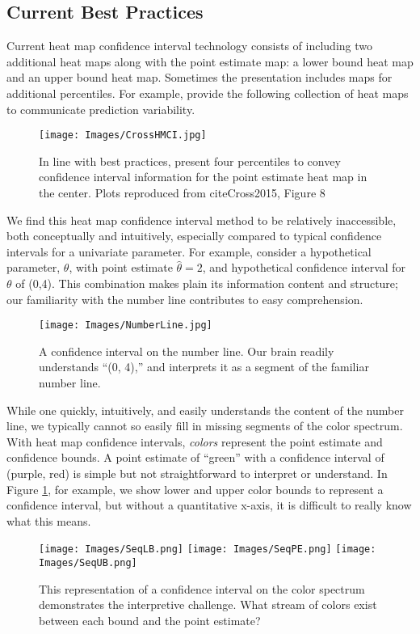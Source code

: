 \subsection{Current Best Practices}

Current heat map confidence interval technology consists of including two additional heat maps along with the point estimate map: a lower bound heat map and an upper bound heat map. Sometimes the presentation includes maps for additional percentiles. For example, \cite{Cross2015} provide the following collection of heat maps to communicate prediction variability.
  \begin{figure}[H]
	\texttt{[image: Images/CrossHMCI.jpg]}
	\caption{In line with best practices, \cite{Cross2015} present four percentiles to convey confidence interval information for the point estimate heat map in the center. Plots reproduced from cite{Cross2015}, Figure 8}
	\end{figure}
We find this heat map confidence interval method to be relatively inaccessible, both conceptually and intuitively, especially compared to typical confidence intervals for a univariate parameter. For example, consider a hypothetical parameter, $\theta$, with point estimate $\hat{\theta} = 2$, and hypothetical confidence interval for $\theta$ of (0,4). This combination makes plain its information content and structure; our familiarity with the number line contributes to easy comprehension.
  \begin{figure}[H]
  \centering
	\texttt{[image: Images/NumberLine.jpg]}
	\caption{A confidence interval on the number line. Our brain readily understands ``(0, 4),'' and interprets it as a segment of the familiar number line. } %
	\end{figure}
While one quickly, intuitively, and easily understands the content of the number line, we typically cannot so easily fill in missing segments of the color spectrum. With heat map confidence intervals, {\it colors} represent the point estimate and confidence bounds. A point estimate of ``green'' with a confidence interval of (purple, red) is simple but not straightforward to interpret or understand. In Figure \ref{fig:colorCI}, for example, we show lower and upper color bounds to represent a confidence interval, but without a quantitative x-axis, it is difficult to really know what this means.
  \begin{figure}[H]
  \centering
	\texttt{[image: Images/SeqLB.png]}
	\texttt{[image: Images/SeqPE.png]}
	\texttt{[image: Images/SeqUB.png]}
	\caption{This representation of a confidence interval on the color spectrum demonstrates the interpretive challenge. What stream of colors exist between each bound and the point estimate?}
	\label{fig:colorCI}
	\end{figure}
